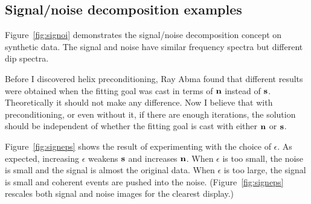 \subsection{Signal/noise decomposition examples}
Figure~\ref{fig:signoi} demonstrates the
signal/noise decomposition concept on synthetic data.
The signal and noise have similar frequency spectra
but different dip spectra.


\par

\par
Before I discovered helix preconditioning,
Ray Abma found that different results were obtained when the
fitting goal was cast in terms of $\bold n$ instead of $\bold s$.
Theoretically it should not make any difference.
Now I believe that with preconditioning, or even without it,
if there are enough iterations,
the solution should be independent
of whether the fitting goal is cast with either $\bold n$ or $\bold s$.

\par
Figure~\ref{fig:signeps} shows the result of experimenting with
the choice of $\epsilon$.
As expected, increasing $\epsilon$
weakens $\bold s$ and increases $\bold n$.
When $\epsilon$ is too small,
                                the noise is small and
                                the signal is almost the original data.
When $\epsilon$ is too large,
                                the signal is small and
                                coherent events are pushed into the noise.
(Figure~\ref{fig:signeps}
rescales both signal and noise images for the clearest display.)

